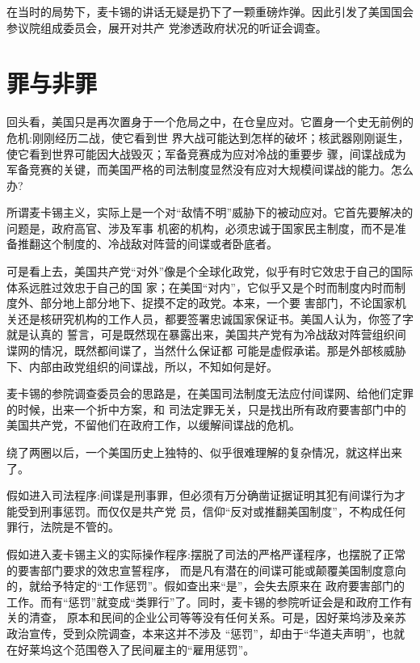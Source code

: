 \documentclass[10pt]{article}
\begin{document}
{在当时的局势下，麦卡锡的讲话无疑是扔下了一颗重磅炸弹。因此引发了美国国会参议院组成委员会，展开对共产
党渗透政府状况的听证会调查。


\pagebreak
\section{罪与非罪}

回头看，美国只是再次置身于一个危局之中，在仓皇应对。它置身一个史无前例的危机:刚刚经历二战，使它看到世
界大战可能达到怎样的破坏；核武器刚刚诞生，使它看到世界可能因大战毁灭；军备竞赛成为应对冷战的重要步
骤，间谍战成为军备竞赛的关键，而美国严格的司法制度显然没有应对大规模间谍战的能力。怎么办?

所谓麦卡锡主义，实际上是一个对``敌情不明''威胁下的被动应对。它首先要解决的问题是，政府高官、涉及军事
机密的机构，必须忠诚于国家民主制度，而不是准备推翻这个制度的、冷战敌对阵营的间谍或者卧底者。

可是看上去，美国共产党``对外''像是个全球化政党，似乎有时它效忠于自己的国际体系远胜过效忠于自己的国
家；在美国``对内''，它似乎又是个时而制度内时而制度外、部分地上部分地下、捉摸不定的政党。本来，一个要
害部门，不论国家机关还是核研究机构的工作人员，都要签署忠诚国家保证书。美国人认为，你签了字就是认真的
誓言，可是既然现在暴露出来，美国共产党有为冷战敌对阵营组织间谍网的情况，既然都间谍了，当然什么保证都
可能是虚假承诺。那是外部核威胁下、内部由政党组织的间谍战，所以，不知如何是好。

麦卡锡的参院调查委员会的思路是，在美国司法制度无法应付间谍网、给他们定罪的时候，出来一个折中方案，和
司法定罪无关，只是找出所有政府要害部门中的美国共产党，不留他们在政府工作，以缓解间谍战的危机。

绕了两圈以后，一个美国历史上独特的、似乎很难理解的复杂情况，就这样出来了。

假如进入司法程序:间谍是刑事罪，但必须有万分确凿证据证明其犯有间谍行为才能受到刑事惩罚。而仅仅是共产党
员，信仰``反对或推翻美国制度''，不构成任何罪行，法院是不管的。

假如进入麦卡锡主义的实际操作程序:摆脱了司法的严格严谨程序，也摆脱了正常的要害部门要求的效忠宣誓程序，
而是凡有潜在的间谍可能或颠覆美国制度意向的，就给予特定的``工作惩罚''。假如查出来``是''，会失去原来在
政府要害部门的工作。而有``惩罚''就变成``类罪行''了。同时，麦卡锡的参院听证会是和政府工作有关的清查，
原本和民间的企业公司等等没有任何关系。可是，因好莱坞涉及亲苏政治宣传，受到众院调查，本来这并不涉及
``惩罚''，却由于``华道夫声明''，也就在好莱坞这个范围卷入了民间雇主的``雇用惩罚''。

}
\end{document}
